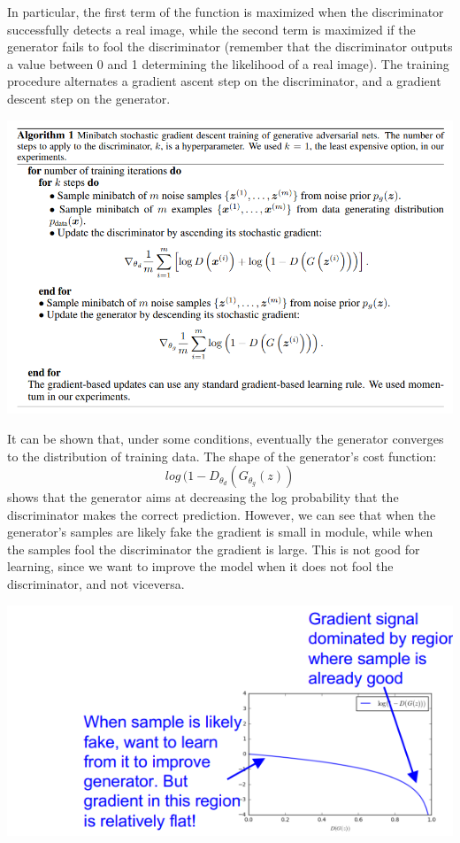 In particular, the first term of the function is maximized when the discriminator successfully detects a real image, while the second term is maximized if the generator fails to fool the discriminator (remember that the discriminator outputs a value between 0 and 1 determining the likelihood of a real image).\newline\newline
The training procedure alternates a gradient ascent step on the discriminator, and a gradient descent step on the generator.
\begin{center}
    \includegraphics[scale=0.8]{images/training GANs.png}
\end{center}
It can be shown that, under some conditions, eventually the generator converges to the distribution of training data.\newline\newline
The shape of the generator's cost function:
\[log\, (1 - D_{\theta_d}(G_{\theta_g}(z))\]
shows that the generator aims at decreasing the log probability that the discriminator makes the correct prediction. However, we can see that when the generator's samples are likely fake the gradient is small in module, while when the samples fool the discriminator the gradient is large. This is not good for learning, since we want to improve the model when it does not fool the discriminator, and not viceversa.
\begin{center}
    \includegraphics[scale=0.6]{images/GAN2.png}
\end{center}
